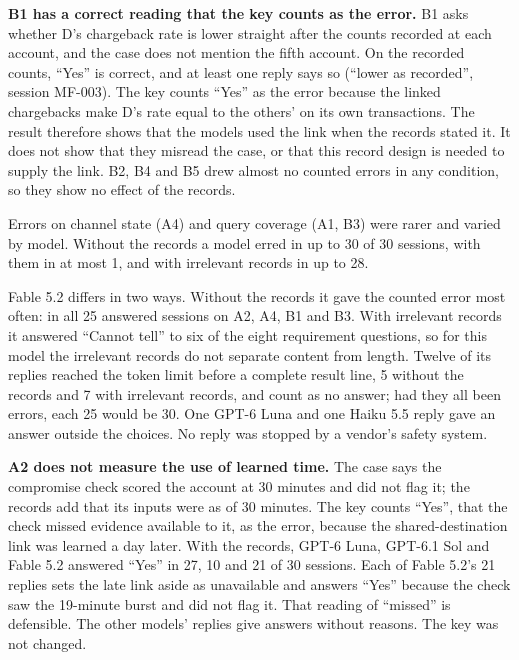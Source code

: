 \documentclass[
  11pt,
]{article}
\begin{document}
\textbf{B1 has a correct reading that the key counts as the error.} B1
asks whether D's chargeback rate is lower straight after the counts
recorded at each account, and the case does not mention the fifth
account. On the recorded counts, ``Yes'' is correct, and at least one
reply says so (``lower as recorded'', session \mbox{MF-003}). The key
counts ``Yes'' as the error because the linked chargebacks make D's rate
equal to the others' on its own transactions. The result therefore shows
that the models used the link when the records stated it. It does not
show that they misread the case, or that this record design is needed to
supply the link. B2, B4 and B5 drew almost no counted errors in any
condition, so they show no effect of the records.

Errors on channel state (A4) and query coverage (A1, B3) were rarer and
varied by model. Without the records a model erred in up to 30 of 30
sessions, with them in at most 1, and with irrelevant records in up to
28.

Fable 5.2 differs in two ways. Without the records it gave the counted
error most often: in all 25 answered sessions on A2, A4, B1 and B3. With
irrelevant records it answered ``Cannot tell'' to six of the eight
requirement questions, so for this model the irrelevant records do not
separate content from length. Twelve of its replies reached the token
limit before a complete result line, 5 without the records and 7 with
irrelevant records, and count as no answer; had they all been errors,
each 25 would be 30. One \mbox{GPT-6} Luna and one Haiku 5.5 reply gave
an answer outside the choices. No reply was stopped by a vendor's safety
system.

\textbf{A2 does not measure the use of learned time.} The case says the
compromise check scored the account at 30 minutes and did not flag it;
the records add that its inputs were as of 30 minutes. The key counts
``Yes'', that the check missed evidence available to it, as the error,
because the shared-destination link was learned a day later. With the
records, \mbox{GPT-6} Luna, \mbox{GPT-6}.1 Sol and Fable 5.2 answered
``Yes'' in 27, 10 and 21 of 30 sessions. Each of Fable 5.2's 21 replies
sets the late link aside as unavailable and answers ``Yes'' because the
check saw the 19-minute burst and did not flag it. That reading of
``missed'' is defensible. The other models' replies give answers without
reasons. The key was not changed.
\end{document}
